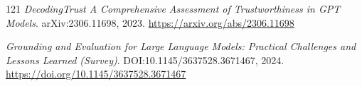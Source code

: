 \documentclass[11pt,a4paper]{article}
\begin{document}
\begin{thebibliography}{121}
\newblock \emph{DecodingTrust A Comprehensive Assessment of Trustworthiness in GPT Models}.
\newblock arXiv:2306.11698, 2023.
\newblock \url{https://arxiv.org/abs/2306.11698}

\newblock \emph{Grounding and Evaluation for Large Language Models: Practical Challenges and Lessons Learned (Survey)}.
\newblock DOI:10.1145/3637528.3671467, 2024.
\newblock \url{https://doi.org/10.1145/3637528.3671467}

\end{thebibliography}
\end{document}

